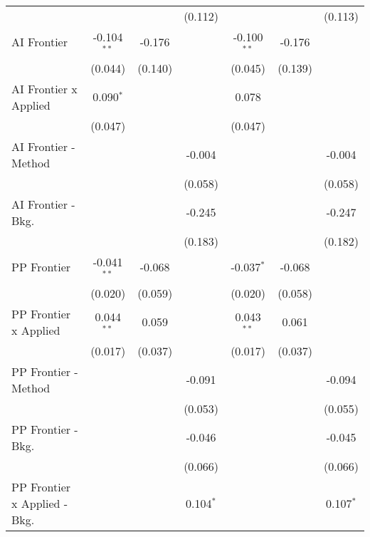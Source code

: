 \begin{tabular}{lcccccc}
                                &               &         & (0.112)     &               &         & (0.113)\\   
   AI Frontier                  & -0.104$^{**}$ & -0.176  &             & -0.100$^{**}$ & -0.176  &   \\   
                                & (0.044)       & (0.140) &             & (0.045)       & (0.139) &   \\   
   AI Frontier x Applied        & 0.090$^{*}$   &         &             & 0.078         &         &   \\   
                                & (0.047)       &         &             & (0.047)       &         &   \\   
   AI Frontier - Method         &               &         & -0.004      &               &         & -0.004\\   
                                &               &         & (0.058)     &               &         & (0.058)\\   
   AI Frontier - Bkg.           &               &         & -0.245      &               &         & -0.247\\   
                                &               &         & (0.183)     &               &         & (0.182)\\   
   PP Frontier                  & -0.041$^{**}$ & -0.068  &             & -0.037$^{*}$  & -0.068  &   \\   
                                & (0.020)       & (0.059) &             & (0.020)       & (0.058) &   \\   
   PP Frontier x Applied        & 0.044$^{**}$  & 0.059   &             & 0.043$^{**}$  & 0.061   &   \\   
                                & (0.017)       & (0.037) &             & (0.017)       & (0.037) &   \\   
   PP Frontier - Method         &               &         & -0.091      &               &         & -0.094\\   
                                &               &         & (0.053)     &               &         & (0.055)\\   
   PP Frontier - Bkg.           &               &         & -0.046      &               &         & -0.045\\   
                                &               &         & (0.066)     &               &         & (0.066)\\   
   PP Frontier x Applied - Bkg. &               &         & 0.104$^{*}$ &               &         & 0.107$^{*}$\\   

\end{tabular}
